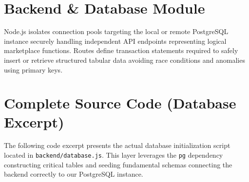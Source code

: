 \documentclass[a4paper,12pt]{report}
\begin{document}
\section{Backend \& Database Module}

Node.js isolates connection pools targeting the local or remote PostgreSQL instance securely handling independent API endpoints representing logical marketplace functions. Routes define transaction statements required to safely insert or retrieve structured tabular data avoiding race conditions and anomalies using primary keys.

\newpage

\section{Complete Source Code (Database Excerpt)}

The following code excerpt presents the actual database initialization script located in \texttt{backend/database.js}. This layer leverages the \texttt{pg} dependency constructing critical tables and seeding fundamental schemas connecting the backend correctly to our PostgreSQL instance.
\end{document}
